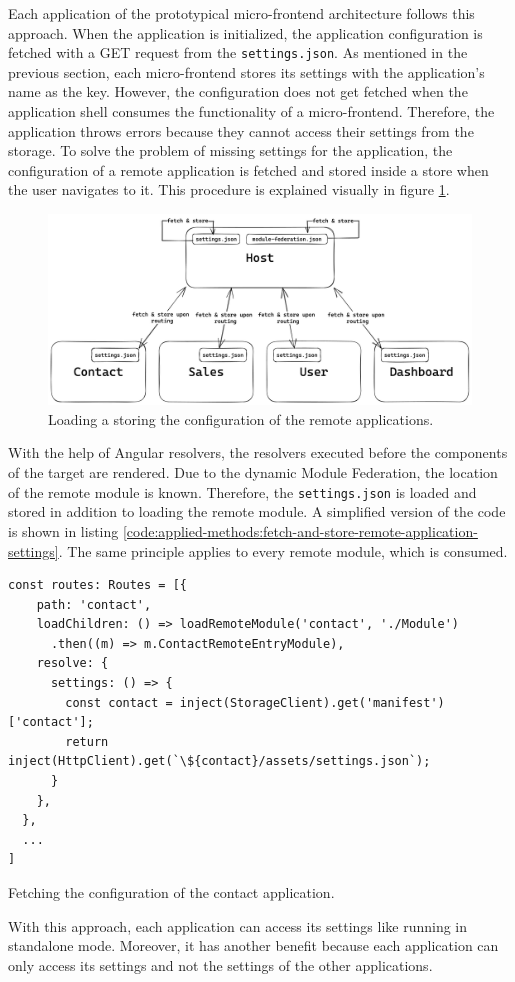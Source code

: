 Each application of the prototypical micro-frontend architecture follows this approach. When the application is initialized, the application configuration is fetched with a GET request from the \texttt{settings.json}. As mentioned in the previous section, each micro-frontend stores its settings with the application's name as the key. However, the configuration does not get fetched when the application shell consumes the functionality of a micro-frontend. Therefore, the application throws errors because they cannot access their settings from the storage. To solve the problem of missing settings for the application, the configuration of a remote application is fetched and stored inside a store when the user navigates to it. This procedure is explained visually in figure \ref{fig:applied-methods:load-remote-settings}.

\ifshowImages
  \begin{figure}[H]
  \centering
  \includegraphics[width=0.9\linewidth]{images/applied-methods/prototypical-implementation/load-remote-settings.png}
  \caption{Loading a storing the configuration of the remote applications.}\label{fig:applied-methods:load-remote-settings}
  \end{figure}
\fi

\noindent With the help of Angular resolvers, the resolvers executed before the components of the target are rendered. Due to the dynamic Module Federation, the location of the remote module is known. Therefore, the \texttt{settings.json} is loaded and stored in addition to loading the remote module. A simplified version of the code is shown in listing \ref{code:applied-methods:fetch-and-store-remote-application-settings}. The same principle applies to every remote module, which is consumed.

\ifshowListings
\begin{listing}[H]
\begin{verbatim}
const routes: Routes = [{
    path: 'contact',
    loadChildren: () => loadRemoteModule('contact', './Module')
      .then((m) => m.ContactRemoteEntryModule),
    resolve: {
      settings: () => {
        const contact = inject(StorageClient).get('manifest')['contact'];
        return inject(HttpClient).get(`\${contact}/assets/settings.json`);
      }
    },
  },
  ...
]
\end{verbatim}
\caption{Fetching the configuration of the contact application.}\label{code:applied-methods:fetch-and-store-remote-application-settings}
\end{listing}
\fi

\noindent With this approach, each application can access its settings like running in standalone mode. Moreover, it has another benefit because each application can only access its settings and not the settings of the other applications. 
